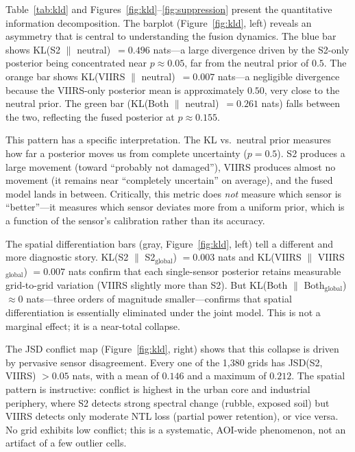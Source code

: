 \documentclass[wcp]{jmlr}
\begin{document}
Table~\ref{tab:kld} and Figures~\ref{fig:kld}--\ref{fig:suppression}
present the quantitative information decomposition. The barplot
(Figure~\ref{fig:kld}, left) reveals an asymmetry that is central to
understanding the fusion dynamics. The blue bar shows KL(S2 $\|$
neutral)~$=0.496$ nats---a large divergence driven by the S2-only
posterior being concentrated near $p \approx 0.05$, far from the neutral
prior of $0.5$. The orange bar shows KL(VIIRS $\|$ neutral)~$=0.007$
nats---a negligible divergence because the VIIRS-only posterior mean is
approximately $0.50$, very close to the neutral prior. The green bar
(KL(Both $\|$ neutral)~$=0.261$ nats) falls between the two, reflecting
the fused posterior at $p \approx 0.155$.

This pattern has a specific interpretation. The KL vs.\ neutral prior
measures how far a posterior moves us from complete uncertainty ($p=0.5$).
S2 produces a large movement (toward ``probably not damaged''), VIIRS
produces almost no movement (it remains near ``completely uncertain'' on
average), and the fused model lands in between. Critically, this metric
does \emph{not} measure which sensor is ``better''---it measures which
sensor deviates more from a uniform prior, which is a function of the
sensor's calibration rather than its accuracy.

The spatial differentiation bars (gray, Figure~\ref{fig:kld}, left) tell a
different and more diagnostic story. KL(S2 $\|$ S2$_{\text{global}}$)
$=0.003$ nats and KL(VIIRS $\|$ VIIRS$_{\text{global}}$) $=0.007$ nats
confirm that each single-sensor posterior retains measurable grid-to-grid
variation (VIIRS slightly more than S2). But KL(Both $\|$
Both$_{\text{global}}$) $\approx 0$ nats---three orders of magnitude
smaller---confirms that spatial differentiation is essentially eliminated
under the joint model. This is not a marginal effect; it is a near-total
collapse.

The JSD conflict map (Figure~\ref{fig:kld}, right) shows that this
collapse is driven by pervasive sensor disagreement. Every one of the
1{,}380 grids has JSD(S2, VIIRS) $> 0.05$ nats, with a mean of $0.146$
and a maximum of $0.212$. The spatial pattern is instructive: conflict is
highest in the urban core and industrial periphery, where S2 detects strong
spectral change (rubble, exposed soil) but VIIRS detects only moderate NTL
loss (partial power retention), or vice versa. No grid exhibits low
conflict; this is a systematic, AOI-wide phenomenon, not an artifact of a
few outlier cells.
\end{document}
